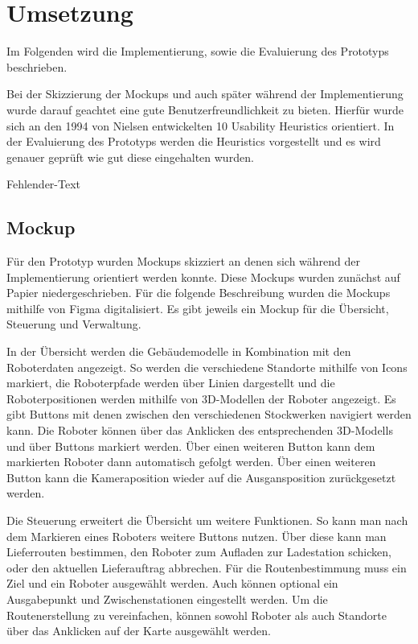 \newpage
\section{Umsetzung}
Im Folgenden wird die Implementierung, sowie die Evaluierung des Prototyps beschrieben.

Bei der Skizzierung der Mockups und auch später während der Implementierung wurde darauf geachtet eine gute Benutzerfreundlichkeit zu bieten. Hierfür wurde sich an den 1994 von Nielsen entwickelten 10 Usability Heuristics orientiert.
In der Evaluierung des Prototyps werden die Heuristics vorgestellt und es wird genauer geprüft wie gut diese eingehalten wurden.

Fehlender-Text

\subsection{Mockup}

Für den Prototyp wurden Mockups skizziert an denen sich während der Implementierung orientiert werden konnte. Diese Mockups wurden zunächst auf Papier niedergeschrieben. Für die folgende Beschreibung wurden die Mockups mithilfe von Figma digitalisiert.
Es gibt jeweils ein Mockup für die Übersicht, Steuerung und Verwaltung. 

In der Übersicht werden die Gebäudemodelle in Kombination mit den Roboterdaten angezeigt. So werden die verschiedene Standorte mithilfe von Icons markiert, die Roboterpfade werden über Linien dargestellt und die Roboterpositionen werden mithilfe von 3D-Modellen der Roboter angezeigt. Es gibt Buttons mit denen zwischen den verschiedenen Stockwerken navigiert werden kann. Die Roboter können über das Anklicken des entsprechenden 3D-Modells und über Buttons markiert werden. Über einen weiteren Button kann dem markierten Roboter dann automatisch gefolgt werden. Über einen weiteren Button kann die Kameraposition wieder auf die Ausgansposition zurückgesetzt werden.

Die Steuerung erweitert die Übersicht um weitere Funktionen. So kann man nach dem Markieren eines Roboters weitere Buttons nutzen. Über diese kann man Lieferrouten bestimmen, den Roboter zum Aufladen zur Ladestation schicken, oder den aktuellen Lieferauftrag abbrechen. Für die Routenbestimmung muss ein Ziel und ein Roboter ausgewählt werden. Auch können optional ein Ausgabepunkt und Zwischenstationen eingestellt werden. Um die Routenerstellung zu vereinfachen, können sowohl Roboter als auch Standorte über das Anklicken auf der Karte ausgewählt werden.

